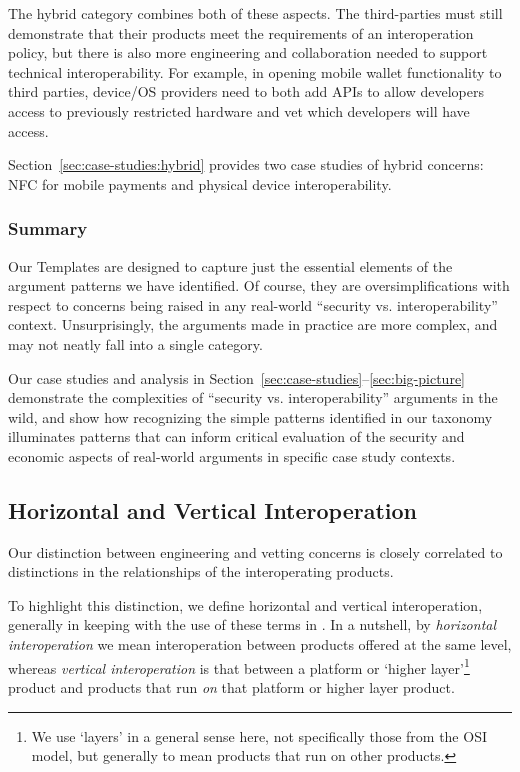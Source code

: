 \documentclass[letterpaper,twocolumn,10pt]{article}
\begin{document}
The hybrid category combines both of these aspects. The third-parties must still demonstrate that their products meet the requirements of an interoperation policy, but there is also more engineering and collaboration needed to support technical interoperability. For example, in opening mobile wallet functionality to third parties, device/OS providers need to both add APIs to allow developers access to previously restricted hardware and vet which developers will have access. 

Section~\ref{sec:case-studies:hybrid} provides two case studies of hybrid concerns: NFC for mobile payments and physical device interoperability.

\subsubsection{Summary}

Our Templates are designed to capture just the essential elements of the argument patterns we have identified. Of course, they are oversimplifications with respect to concerns being raised in any real-world ``security vs. interoperability'' context. Unsurprisingly, the arguments made in practice are more complex, and may not neatly fall into a single category.

Our case studies and analysis in Section~\ref{sec:case-studies}--\ref{sec:big-picture} demonstrate the complexities of ``security vs. interoperability'' arguments in the wild, and show how recognizing the simple patterns identified in our taxonomy illuminates patterns that can inform critical evaluation of the security and economic aspects of real-world arguments in specific case study contexts.

\subsection{Horizontal and Vertical Interoperation}
\label{sec:framework:horiz-vertical}

Our distinction between engineering and vetting concerns is closely correlated to distinctions in the relationships of the interoperating products. 

To highlight this distinction, we define horizontal and vertical interoperation, generally in keeping with the use of these terms in \cite{hor_vert_interop}.  In a nutshell, by \emph{horizontal interoperation} we mean interoperation between products offered at the same level, 
whereas \emph{vertical interoperation} is that between a platform or `higher layer'\footnote{We use `layers' in a general sense here, not specifically those from the OSI model, but generally to mean products that run on other products.} product and products that run \emph{on} that platform or higher layer product. 
\end{document}
